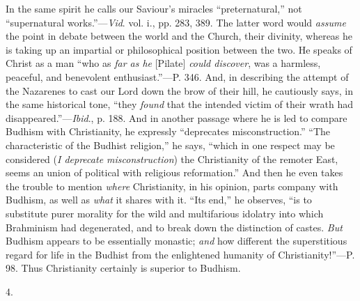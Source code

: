 In the same spirit he calls our Saviour's
miracles ``preternatural,'' not ``supernatural works.''—\emph{Vid}. vol. i.,
pp. 283, 389. The latter word would \emph{assume} the point in debate
between the world and the Church, their divinity, whereas he is taking
up an impartial or philosophical position between the two. He speaks
of Christ as a man ``who as \emph{far as he} [Pilate] \emph{could discover},
was a harmless, peaceful, and benevolent enthusiast.''—P. 346. And,
in describing the attempt of the Nazarenes to cast our Lord down the
brow of their hill, he cautiously says, in the same historical tone, ``they
\emph{found} that the intended victim of their wrath had disappeared.''—\emph{Ibid}.,
p. 188. And in another passage where he is led to compare Budhism with
Christianity, he expressly ``deprecates misconstruction.'' ``The
characteristic of the Budhist religion,'' he says, ``which in one
respect may be considered (\emph{I deprecate misconstruction}) the
Christianity of the remoter East, seems an union of political
with religious reformation.'' And then he even takes the trouble to
mention \emph{where} Christianity, in his opinion, parts company with
Budhism, as well as \emph{what} it shares with it. ``Its end,'' he
observes, ``is to substitute purer morality for the wild and
multifarious idolatry into which Brahminism had degenerated, and to
break down the distinction of castes. \emph{But} Budhism appears to be
essentially monastic; \emph{and} how different the superstitious
regard for life in the Budhist from the enlightened humanity of
Christianity!''—P. 98. Thus Christianity certainly is superior to
Budhism.

4.

